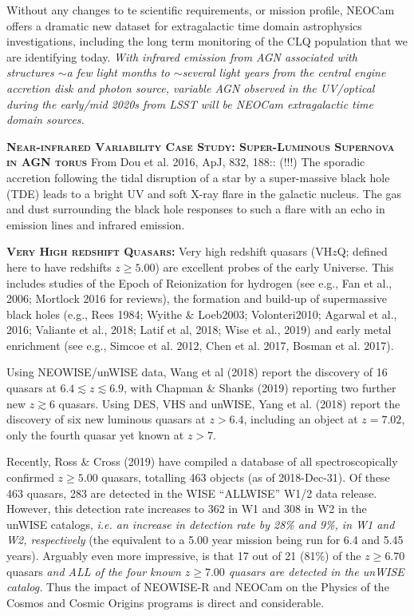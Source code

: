 \documentclass[12pt]{article}
\begin{document}
\smallskip
\smallskip
\noindent
Without any changes to te scientific requirements, or mission profile, NEOCam offers 
a dramatic new dataset for extragalactic time domain astrophysics investigations, including
the long term monitoring of the CLQ population that we are identifying today.
{\it With infrared emission from AGN associated with structures $\sim$a few light months to $\sim$several light years from the central engine accretion disk and photon source, variable AGN observed in the UV/optical during the early/mid 2020s from LSST will be NEOCam extragalactic time domain sources.}


\smallskip
\smallskip
\noindent
\textbf{\textsc{Near-infrared Variability Case Study: Super-Luminous Supernova in AGN torus}} 
From Dou et al. 2016, ApJ, 832, 188:: (!!!) 
The sporadic accretion following the tidal disruption of a star by a
super-massive black hole (TDE) leads to a bright UV and soft X-ray
flare in the galactic nucleus. The gas and dust surrounding the black
hole responses to such a flare with an echo in emission lines and
infrared emission.

\smallskip
\smallskip
\noindent
\textbf{\textsc{Very High redshift Quasars:}} 
Very high redshift quasars (VH$z$Q; defined here to have redshifts $z\geq5.00$) are excellent probes of the early Universe. This includes studies of the Epoch of Reionization for hydrogen (see e.g., Fan et al., 2006; Mortlock 2016 for reviews), the formation and build-up of supermassive black holes (e.g., Rees 1984; Wyithe \& Loeb2003; Volonteri2010; Agarwal et al., 2016; Valiante et al., 2018; Latif et al, 2018; Wise et al., 2019) and early metal enrichment (see e.g., Simcoe et al. 2012, Chen et al. 2017, Bosman et al. 2017).

\smallskip
\smallskip
\noindent
Using NEOWISE/unWISE data, Wang et al (2018) 
report the discovery of 16 quasars at $6.4\lesssim z \lesssim 6.9$,  
with Chapman \& Shanks (2019) reporting two further new $z\gtrsim6$ quasars. 
Using DES, VHS and unWISE, Yang et al. (2018) report the discovery of six new luminous quasars at $z > 6.4$, 
including an object at $z = 7.02$, only the fourth quasar yet known at $z > 7$. 

\smallskip
\smallskip
\noindent
Recently, Ross \& Cross (2019) have compiled a database of all 
spectroscopically confirmed $z\geq5.00$ quasars, totalling 463 objects (as of 
2018-Dec-31). Of these 463 quasars, 283 are detected in the WISE ``ALLWISE'' W1/2 
data release. However, this detection rate increases to 362 in W1 and 308 in W2 
in the unWISE catalogs, {\it i.e. an increase in detection rate by 28\% and 9\%, in W1 and W2, 
respectively} (the equivalent to a 5.00 year mission being run for 6.4 and 5.45 years).
Arguably even more impressive, is that 17  out of  21 (81\%) of the $z\geq6.70$
quasars {\it and ALL of the four known $z\geq7.00$ quasars are detected in the 
unWISE catalog.}
Thus the impact of NEOWISE-R and NEOCam on the Physics of the Cosmos and 
Cosmic Origins programs is direct and considerable.
\end{document}
